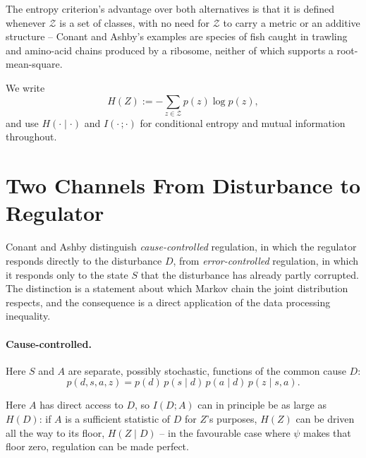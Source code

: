 \documentclass[11pt]{article}
\theoremstyle{definition}
\theoremstyle{remark}
\newcommand{\Zcal}{\mathcal{Z}}
\begin{document}
The entropy criterion's advantage over both alternatives is that it is
defined whenever $\Zcal$ is a set of classes, with no need for $\Zcal$ to
carry a metric or an additive structure -- Conant and Ashby's examples are
species of fish caught in trawling and amino-acid chains produced by a
ribosome, neither of which supports a root-mean-square.

We write
\[
H(Z) := -\sum_{z\in\Zcal} p(z)\log p(z),
\]
and use $H(\cdot\mid\cdot)$ and $I(\cdot\,;\cdot)$ for conditional entropy
and mutual information throughout.

\section{Two Channels From Disturbance to Regulator}
\label{sec:causal}

Conant and Ashby distinguish \emph{cause-controlled} regulation, in which
the regulator responds directly to the disturbance $D$, from
\emph{error-controlled} regulation, in which it responds only to the
state $S$ that the disturbance has already partly corrupted. The
distinction is a statement about which Markov chain the joint distribution
respects, and the consequence is a direct application of the data
processing inequality.

\paragraph{Cause-controlled.} Here $S$ and $A$ are separate, possibly
stochastic, functions of the common cause $D$:
\[
p(d,s,a,z) = p(d)\,p(s\mid d)\,p(a\mid d)\,p(z\mid s,a).
\]

\begin{center}
\end{center}

Here $A$ has direct access to $D$, so $I(D;A)$ can in principle be as large
as $H(D)$: if $A$ is a sufficient statistic of $D$ for $Z$'s purposes,
$H(Z)$ can be driven all the way to its floor, $H(Z\mid D)$ -- in the
favourable case where $\psi$ makes that floor zero, regulation can be made
perfect.
\end{document}
